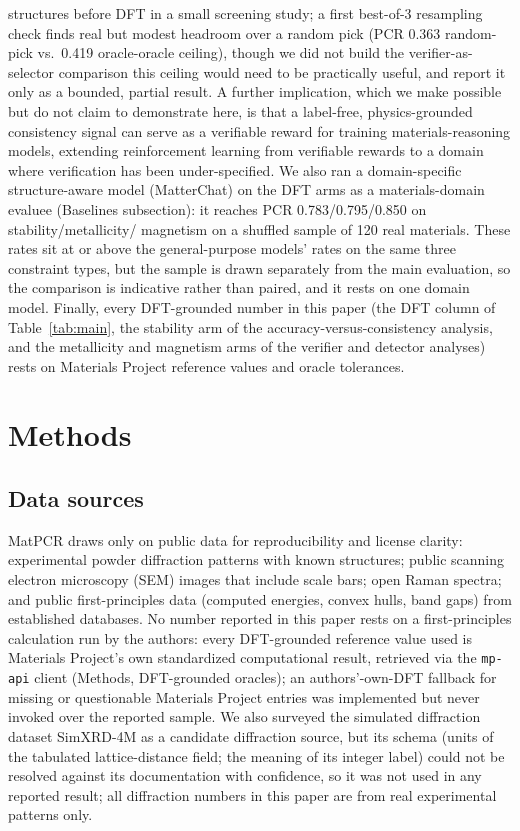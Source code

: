 \documentclass[pdflatex,sn-nature]{sn-jnl}
\begin{document}
structures before DFT in a small screening study; a first best-of-3 resampling check finds
real but modest headroom over a random pick (PCR 0.363 random-pick vs.\ 0.419 oracle-oracle
ceiling), though we did not build the verifier-as-selector comparison this ceiling would
need to be practically useful, and report it only as a bounded, partial result. A further implication,
which we make possible but do not claim to demonstrate here, is that a label-free,
physics-grounded consistency signal can serve as a verifiable reward for training
materials-reasoning models, extending reinforcement learning from verifiable rewards
to a domain where verification has been under-specified.\cite{scirlvr2026} We also ran a
domain-specific structure-aware model (MatterChat) on the DFT arms as a materials-domain
evaluee (Baselines subsection): it reaches PCR 0.783/0.795/0.850 on stability/metallicity/
magnetism on a shuffled sample of 120 real materials. These rates sit at or above the
general-purpose models' rates on the same three constraint types, but the sample is drawn
separately from the main evaluation, so the comparison is indicative rather than paired,
and it rests on one domain model. Finally,
every DFT-grounded number in this paper (the DFT column of Table~\ref{tab:main}, the
stability arm of the accuracy-versus-consistency analysis, and the metallicity and
magnetism arms of the verifier and detector analyses) rests on Materials Project
reference values and oracle tolerances.

\section*{Methods}
\subsection*{Data sources}
MatPCR draws only on public data for reproducibility and license clarity: experimental
powder diffraction patterns with known structures;\cite{opxrd2025} public scanning electron microscopy (SEM) images that include scale bars;\cite{aversa2018nffa} open Raman spectra;\cite{lafuente2015rruff} and public first-principles data (computed energies, convex hulls, band gaps) from established databases.\cite{matproj2013} No number reported in this paper rests on a first-principles calculation run by the authors: every DFT-grounded reference value used is Materials Project's own standardized computational result, retrieved via the \texttt{mp-api} client (Methods, DFT-grounded oracles); an authors'-own-DFT fallback for missing or questionable Materials Project entries was implemented but never invoked over the reported sample. We also surveyed the simulated diffraction dataset SimXRD-4M\cite{simxrd2024} as a candidate diffraction source, but its schema (units of the tabulated lattice-distance field; the meaning of its integer label) could not be resolved against its documentation with confidence, so it was not used in any reported result; all diffraction numbers in this paper are from real experimental
patterns only.
\end{document}
